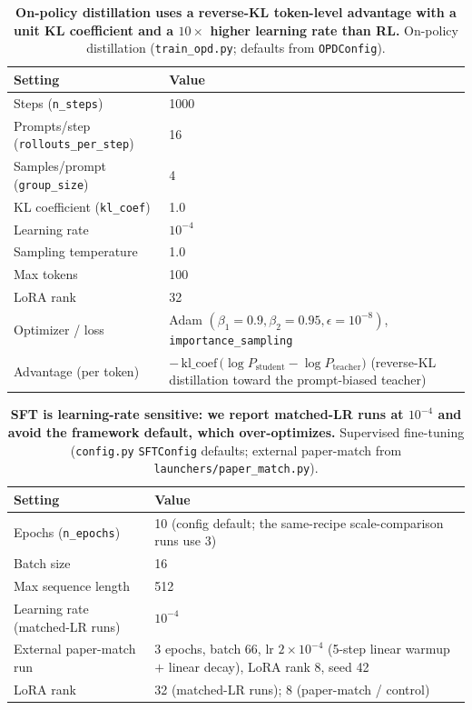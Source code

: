 \begin{table}[h]
\centering
\caption{\textbf{On-policy distillation uses a reverse-KL token-level advantage with a
unit KL coefficient and a $10\times$ higher learning rate than RL.}
On-policy distillation (\texttt{train\_opd.py}; defaults from \texttt{OPDConfig}).}
\label{tab:opd-hp}
\begin{tabularx}{\linewidth}{@{}lX@{}}
\toprule
Setting & Value \\
\midrule
Steps (\texttt{n\_steps}) & 1000 \\
\addlinespace
Prompts/step (\texttt{rollouts\_per\_step}) & 16 \\
\addlinespace
Samples/prompt (\texttt{group\_size}) & 4 \\
\addlinespace
KL coefficient (\texttt{kl\_coef}) & 1.0 \\
\addlinespace
Learning rate & $10^{-4}$ \\
\addlinespace
Sampling temperature & 1.0 \\
\addlinespace
Max tokens & 100 \\
\addlinespace
LoRA rank & 32 \\
\addlinespace
Optimizer / loss & Adam $(\beta_1{=}0.9,\beta_2{=}0.95,\epsilon{=}10^{-8})$,
  \texttt{importance\_sampling} \\
\addlinespace
Advantage (per token) &
  $-\,\text{kl\_coef}\,\bigl(\log P_{\text{student}} - \log P_{\text{teacher}}\bigr)$
  (reverse-KL distillation toward the prompt-biased teacher) \\
\bottomrule
\end{tabularx}
\end{table}

\begin{table}[h]
\centering
\caption{\textbf{SFT is learning-rate sensitive: we report matched-LR runs at
$10^{-4}$ and avoid the framework default, which over-optimizes.} Supervised
fine-tuning (\texttt{config.py} \texttt{SFTConfig} defaults; external paper-match
from \texttt{launchers/paper\_match.py}).}
\begin{tabularx}{\linewidth}{@{}lX@{}}
\toprule
Setting & Value \\
\midrule
Epochs (\texttt{n\_epochs}) & 10 (config default; the same-recipe scale-comparison
  runs use 3) \\
\addlinespace
Batch size & 16 \\
\addlinespace
Max sequence length & 512 \\
\addlinespace
Learning rate (matched-LR runs) & $10^{-4}$ \\
\addlinespace
External paper-match run & 3 epochs, batch 66, lr $2\times10^{-4}$
  (5-step linear warmup $+$ linear decay), LoRA rank 8, seed 42 \\
\addlinespace
LoRA rank & 32 (matched-LR runs); 8 (paper-match / control) \\
\bottomrule
\end{tabularx}
\end{table}

